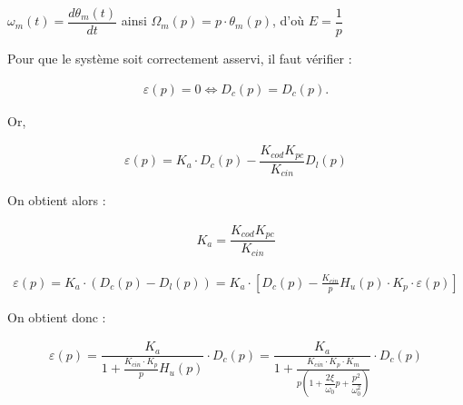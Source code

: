 
\begin{texteCache}
$\omega_m(t)=\dfrac{d\theta_m(t)}{dt}$ ainsi $\Omega_m(p)=p\cdot \theta_m(p)$, d'où $E=\dfrac{1}{p}$

\end{texteCache}


\begin{texteCache}
Pour que le système soit correctement asservi, il faut vérifier : 

\begin{align*}
\varepsilon(p)=0\Leftrightarrow D_c(p)=D_c(p).
\end{align*}

Or,

\begin{align*}
\varepsilon(p)=K_a\cdot D_c(p)-\dfrac{K_{cod}K_{pc}}{K_{cin}}D_l(p)
\end{align*}

On obtient alors : 

\begin{align*}
\boxed{
K_a=\dfrac{K_{cod}K_{pc}}{K_{cin}}
}
\end{align*}
\end{texteCache}


\begin{texteCache}
\begin{align*}
\varepsilon(p)=K_a\cdot \left(D_c(p)-D_l(p)\right)=K_a\cdot \left[D_c(p)-\frac{K_{cin}}{p}H_u(p)\cdot K_p\cdot \varepsilon(p)\right]
\end{align*}

On obtient donc : 

\begin{align*}
\boxed{
\varepsilon(p)=\dfrac{K_a}{1+\frac{K_{cin}\cdot K_p}{p}H_u(p)}\cdot D_c(p)=\dfrac{K_a}{1+\frac{K_{cin}\cdot K_p\cdot K_m}{p\left(1+\dfrac{2\xi}{\omega_0}p+\dfrac{p^2}{\omega_0^2}\right)}}\cdot D_c(p)
}
\end{align*}

\end{texteCache}

